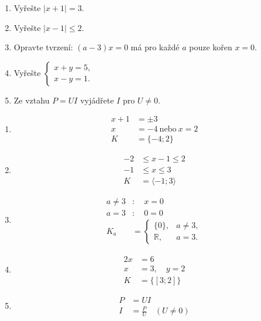 \documentclass[11pt,a4paper]{article}
\begin{document}
\begin{zadaniReseniBox}[title={Domácí úkol}]
\begin{enumerate}[label=\alph*),itemsep=2pt]
\item Vyřešte $|x+1|=3$.
\item Vyřešte $|x-1|\le2$.
\item Opravte tvrzení: $(a-3)x=0$ má pro každé $a$ pouze kořen $x=0$.
\item Vyřešte $\begin{cases}x+y=5,\\x-y=1.\end{cases}$
\item Ze vztahu $P=UI$ vyjádřete $I$ pro $U\ne0$.
\end{enumerate}
\tcblower
\begin{enumerate}[label=\alph*),itemsep=1pt]
\item
\[\begin{aligned}
x+1&=\pm3 \\
x&=-4\ \text{nebo}\ x=2 \\
K&=\{-4;2\}
\end{aligned}\]
\item
\[\begin{aligned}
-2&\le x-1\le2 \\
-1&\le x\le3 \\
K&=\langle-1;3\rangle
\end{aligned}\]
\item
\[\begin{aligned}
a\ne3&:\quad x=0 \\
a=3&:\quad 0=0 \\
K_a&=\begin{cases}\{0\},&a\ne3,\\\mathbb R,&a=3.\end{cases}
\end{aligned}\]
\item
\[\begin{aligned}
2x&=6 \\
x&=3,\quad y=2 \\
K&=\{[3;2]\}
\end{aligned}\]
\item
\[\begin{aligned}
P&=UI \\
I&=\frac PU\quad(U\ne0)
\end{aligned}\]
\end{enumerate}
\end{zadaniReseniBox}
\end{document}

